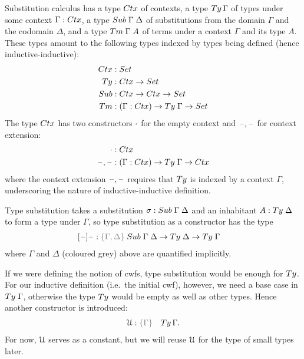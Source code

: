 \documentclass[a4paper,UKenglish,numberwithinsect,cleveref,thm-restate]{lipics-v2021}
\begin{document}
Substitution calculus has a type $\Ctx$ of contexts, a type $\Ty\,\Gamma$ of types under some context $\Gamma : \Ctx$, a type $\Sub\;\Gamma\;\Delta$ of substitutions from the domain $\Gamma$ and the codomain $\Delta$, and a type $\Tm\;\Gamma\;A$ of terms under a context $\Gamma$ and its type $A$. 
These types amount to the following types indexed by types being defined (hence inductive-inductive):
\begin{alignat*}{3}
  \Ctx   & : \Set                   \\
  \Ty    & : \Ctx \to \Set          \\
  \Sub   & : \Ctx \to \Ctx \to \Set \\
  \Tm    & : (\Gamma : \Ctx) \to \Ty\;\Gamma \to \Set
\end{alignat*}
The type $\Ctx$ has two constructors $\cdot$ for the empty context and $\mathord{\hspace{1pt}\text{--}\hspace{1pt}},\mathord{\hspace{1pt}\text{--}\hspace{1pt}}$ for context extension:
\begin{alignat*}{3}
  \emptyctx & : \Ctx \\
  \blank,\blank & : (\Gamma : \Ctx) \to \Ty\;\Gamma \to \Ctx
\end{alignat*}
where the context extension $\mathord{\hspace{1pt}\text{--}\hspace{1pt}},\mathord{\hspace{1pt}\text{--}\hspace{1pt}}$ requires that $\Ty$ is indexed by a context $\Gamma$, underscoring the nature of inductive-inductive definition.

Type substitution takes a substitution $\sigma : \Sub\;\Gamma\;\Delta$ and an inhabitant $A : \Ty\;\Delta$ to form a type under $\Gamma$, so type substitution as a constructor has the type
\begin{alignat*}{3}
  [\blank]\blank &: \implicit{\Gamma, \Delta} \; \Sub\;\Gamma\;\Delta \to \Ty\;\Delta \to \Ty\;\Gamma
\end{alignat*}
where $\Gamma$ and $\Delta$ (coloured {\color{gray}grey}) above are quantified implicitly.

If we were defining the notion of cwfs, type substitution would be enough for $\Ty$.
For our inductive definition (i.e.\ the initial cwf), however, we need a base case in $\Ty\;\Gamma$, otherwise the type $\Ty$ would be empty as well as other types.
Hence another constructor is introduced:
\begin{alignat*}{3}
  \UU & : \implicit{\Gamma} & \Ty\, \Gamma.
\end{alignat*}
For now, $\mathcal{U}$ serves as a constant, but we will reuse $\mathcal{U}$ for the type of small types later.
\end{document}
